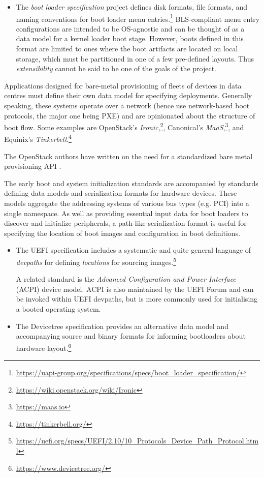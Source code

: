 \begin{itemize}
  \item
    The \emph{boot loader specification} project defines disk formats, file formats, and naming conventions for boot loader menu entries.\footnote{\url{https://uapi-group.org/specifications/specs/boot_loader_specification/}} 
    BLS-compliant menu entry configurations are intended to be OS-agnostic and can be thought of as a data model for a kernel loader boot stage.
    However, boots defined in this format are limited to ones where the boot artifacts are located on local storage, which must be partitioned in one of a few pre-defined layouts. 
    Thus \emph{extensibility} cannot be said to be one of the goals of the project.

\end{itemize}

Applications designed for bare-metal provisioning of fleets of devices in data centres must define their own data model for specifying deployments.
%
Generally speaking, these systems operate over a network (hence use network-based boot protocols, the major one being PXE) and are opinionated about the structure of boot flow.
%
Some examples are OpenStack's \emph{Ironic},\footnote{\url{https://wiki.openstack.org/wiki/Ironic}}, Canonical's \emph{MaaS},\footnote{\url{https://maas.io}}, and Equinix's \emph{Tinkerbell}.\footnote{\url{https://tinkerbell.org/}}

The OpenStack authors have written on the need for a standardized bare metal provisioning API \cite{openstack2023building}.

The early boot and system initialization standards are accompanied by standards defining data models and serialization formats for hardware devices.
%
These models aggregate the addressing systems of various bus types (e.g. PCI) into a single namespace.
%
As well as providing essential input data for boot loaders to discover and initialize peripherals, a path-like serialization format is useful for specifying the location of boot images and configuration in boot definitions.
%
\begin{itemize}
  \item
    The UEFI specification includes a systematic and quite general language of \emph{devpaths} for defining \emph{locations} for sourcing images.\footnote{\url{https://uefi.org/specs/UEFI/2.10/10\_Protocols\_Device\_Path\_Protocol.html}}

    A related standard is the \emph{Advanced Configuration and Power Interface} (ACPI) device model. 
    ACPI is also maintained by the UEFI Forum and can be invoked within UEFI devpaths, but is more commonly used for initialising a booted operating system.
    
  \item
    The Devicetree specification provides an alternative data model and accompanying source and binary formats for informing bootloaders about hardware layout.\footnote{\url{https://www.devicetree.org/}}
\end{itemize}

